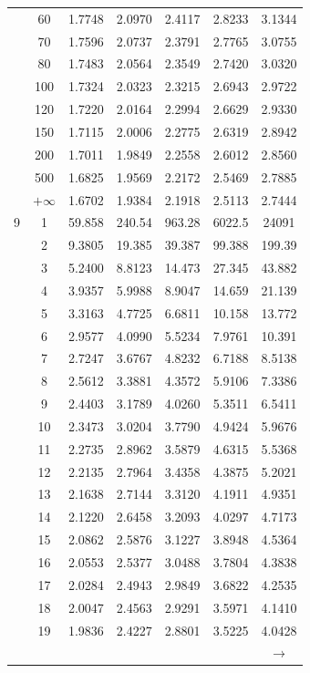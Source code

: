 \begin{minipage}{0.49\textwidth}
\begin{center}
\begin{tabular}{ccccccc}
			& 60 & 1.7748 & 2.0970 & 2.4117 & 2.8233 & 3.1344 \\
			& 70 & 1.7596 & 2.0737 & 2.3791 & 2.7765 & 3.0755 \\
			& 80 & 1.7483 & 2.0564 & 2.3549 & 2.7420 & 3.0320 \\
			& 100 & 1.7324 & 2.0323 & 2.3215 & 2.6943 & 2.9722 \\
			& 120 & 1.7220 & 2.0164 & 2.2994 & 2.6629 & 2.9330 \\
			& 150 & 1.7115 & 2.0006 & 2.2775 & 2.6319 & 2.8942 \\
			& 200 & 1.7011 & 1.9849 & 2.2558 & 2.6012 & 2.8560 \\
			& 500 & 1.6825 & 1.9569 & 2.2172 & 2.5469 & 2.7885 \\
			& $+\infty$ & 1.6702 & 1.9384 & 2.1918 & 2.5113 & 2.7444 \\
			\midrule
			9 & 1 & 59.858 & 240.54 & 963.28 & 6022.5 & 24091 \\
			& 2 & 9.3805 & 19.385 & 39.387 & 99.388 & 199.39 \\
			& 3 & 5.2400 & 8.8123 & 14.473 & 27.345 & 43.882 \\
			& 4 & 3.9357 & 5.9988 & 8.9047 & 14.659 & 21.139 \\
			& 5 & 3.3163 & 4.7725 & 6.6811 & 10.158 & 13.772 \\
			& 6 & 2.9577 & 4.0990 & 5.5234 & 7.9761 & 10.391 \\
			& 7 & 2.7247 & 3.6767 & 4.8232 & 6.7188 & 8.5138 \\
			& 8 & 2.5612 & 3.3881 & 4.3572 & 5.9106 & 7.3386 \\
			& 9 & 2.4403 & 3.1789 & 4.0260 & 5.3511 & 6.5411 \\[5pt]
			& 10 & 2.3473 & 3.0204 & 3.7790 & 4.9424 & 5.9676 \\
			& 11 & 2.2735 & 2.8962 & 3.5879 & 4.6315 & 5.5368 \\
			& 12 & 2.2135 & 2.7964 & 3.4358 & 4.3875 & 5.2021 \\
			& 13 & 2.1638 & 2.7144 & 3.3120 & 4.1911 & 4.9351 \\
			& 14 & 2.1220 & 2.6458 & 3.2093 & 4.0297 & 4.7173 \\
			& 15 & 2.0862 & 2.5876 & 3.1227 & 3.8948 & 4.5364 \\
			& 16 & 2.0553 & 2.5377 & 3.0488 & 3.7804 & 4.3838 \\
			& 17 & 2.0284 & 2.4943 & 2.9849 & 3.6822 & 4.2535 \\
			& 18 & 2.0047 & 2.4563 & 2.9291 & 3.5971 & 4.1410 \\
			& 19 & 1.9836 & 2.4227 & 2.8801 & 3.5225 & 4.0428 \\
			&  &  &  &  &  & $\rightarrow$ \\
		\end{tabular}
	\end{center}
\end{minipage}
